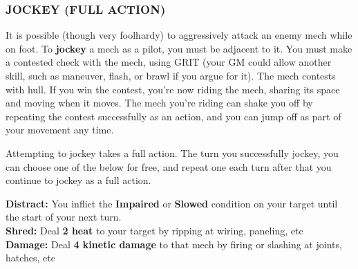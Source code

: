 \subsubsection{JOCKEY (FULL ACTION)}
It is possible (though very foolhardy) to aggressively attack an enemy mech while on foot. To \textbf{jockey} a mech as a pilot, you must be adjacent to it. You must make a contested check with the mech, using GRIT (your GM could allow another skill, such as maneuver, flash, or brawl if you argue for it). The mech contests with hull. If you win the contest, you’re now riding the mech, sharing its space and moving when it moves. The mech you’re riding can shake you off by repeating the contest successfully as an action, and you can jump off as part of your movement any time. 

Attempting to jockey takes a full action. The turn you successfully jockey, you can choose one of the below for free, and repeat one each turn after that you continue to jockey as a full action.

\textbf{Distract:} You inflict the \textbf{Impaired} or \textbf{Slowed} condition on your target until the start of your next turn.\\
\textbf{Shred:} Deal \textbf{2 heat} to your target by ripping at wiring, paneling, etc\\
\textbf{Damage:} Deal \textbf{4 kinetic damage} to that mech by firing or slashing at joints, hatches, etc